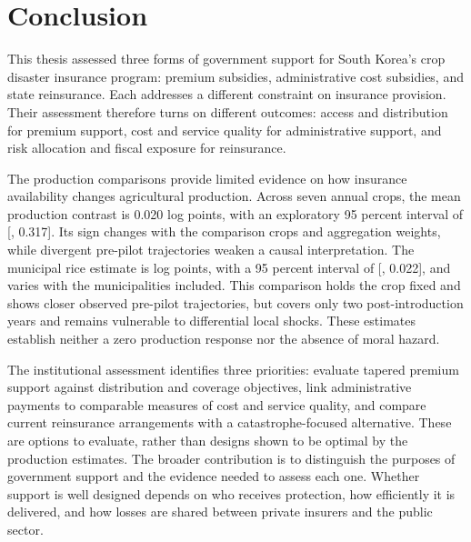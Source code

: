 \chapter{Conclusion}\label{ch:conclusion}

This thesis assessed three forms of government support for South Korea's crop disaster insurance program: premium subsidies, administrative cost subsidies, and state reinsurance. Each addresses a different constraint on insurance provision. Their assessment therefore turns on different outcomes: access and distribution for premium support, cost and service quality for administrative support, and risk allocation and fiscal exposure for reinsurance.

The production comparisons provide limited evidence on how insurance availability changes agricultural production. Across seven annual crops, the mean production contrast is 0.020 log points, with an exploratory 95 percent interval of [, 0.317]. Its sign changes with the comparison crops and aggregation weights, while divergent pre-pilot trajectories weaken a causal interpretation. The municipal rice estimate is  log points, with a 95 percent interval of [, 0.022], and varies with the municipalities included. This comparison holds the crop fixed and shows closer observed pre-pilot trajectories, but covers only two post-introduction years and remains vulnerable to differential local shocks. These estimates establish neither a zero production response nor the absence of moral hazard.

The institutional assessment identifies three priorities: evaluate tapered premium support against distribution and coverage objectives, link administrative payments to comparable measures of cost and service quality, and compare current reinsurance arrangements with a catastrophe-focused alternative. These are options to evaluate, rather than designs shown to be optimal by the production estimates. The broader contribution is to distinguish the purposes of government support and the evidence needed to assess each one. Whether support is well designed depends on who receives protection, how efficiently it is delivered, and how losses are shared between private insurers and the public sector.
